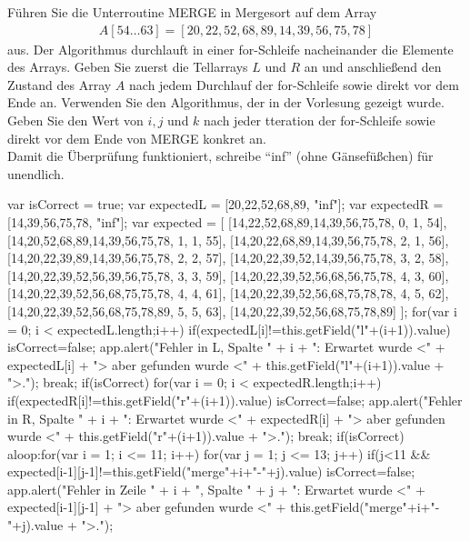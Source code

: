 \documentclass[a4paper,12pt]{article}
\begin{document}
 
\noindent Führen Sie die Unterroutine MERGE in Mergesort auf dem Array
\begin{align*}
    A[54 \ldots 63]=[20,22,52,68,89,14,39,56,75,78]
\end{align*}
aus. Der Algorithmus durchlauft in einer for-Schleife nacheinander die Elemente des Arrays. Geben Sie zuerst die
Tellarrays $L$ und $R$ an und anschlie\ss{}end den Zustand des Array $A$ nach jedem Durchlauf der for-Schleife sowie direkt
vor dem Ende an. Verwenden Sie den Algorithmus, der in der Vorlesung gezeigt wurde. Geben Sie den Wert von $i, j$
und $k$ nach jeder tteration der for-Schleife sowie direkt vor dem Ende von MERGE konkret an.\\
Damit die Überprüfung funktioniert, schreibe "`inf"' (ohne Gänsefü\ss{}chen) für unendlich.
\def\textfieldwidth{.8cm}
\begin{defineJS}{\aNiceScript}
    var isCorrect = true;
    var expectedL = [20,22,52,68,89, "inf"];
    var expectedR = [14,39,56,75,78, "inf"];
    var expected = [
        [14,22,52,68,89,14,39,56,75,78, 0, 1, 54],
        [14,20,52,68,89,14,39,56,75,78, 1, 1, 55],
        [14,20,22,68,89,14,39,56,75,78, 2, 1, 56],
        [14,20,22,39,89,14,39,56,75,78, 2, 2, 57],
        [14,20,22,39,52,14,39,56,75,78, 3, 2, 58],
        [14,20,22,39,52,56,39,56,75,78, 3, 3, 59],
        [14,20,22,39,52,56,68,56,75,78, 4, 3, 60],
        [14,20,22,39,52,56,68,75,75,78, 4, 4, 61],
        [14,20,22,39,52,56,68,75,78,78, 4, 5, 62],
        [14,20,22,39,52,56,68,75,78,89, 5, 5, 63],
        [14,20,22,39,52,56,68,75,78,89]
        ];
    for(var i = 0; i < expectedL.length;i++){
        if(expectedL[i]!=this.getField("l"+(i+1)).value) {
            isCorrect=false;
            app.alert("Fehler in L, Spalte " + i + ": Erwartet wurde <" + expectedL[i] + "> aber gefunden wurde <" + this.getField("l"+(i+1)).value + ">.");
            break;
        }
    }
    if(isCorrect){
        for(var i = 0; i < expectedR.length;i++){
            if(expectedR[i]!=this.getField("r"+(i+1)).value) {
                isCorrect=false;
                app.alert("Fehler in R, Spalte " + i + ": Erwartet wurde <" + expectedR[i] + "> aber gefunden wurde <" + this.getField("r"+(i+1)).value + ">.");
                break;
            }
        }
    }
    if(isCorrect){
        aloop:for(var i = 1; i <= 11; i++) {
            for(var j = 1; j <= 13; j++) {
                if(j<11 && expected[i-1][j-1]!=this.getField("merge"+i+"-"+j).value){
                    isCorrect=false;
                    app.alert("Fehler in Zeile " + i + ", Spalte " + j + ": Erwartet wurde <" + expected[i-1][j-1] + "> aber gefunden wurde <" + this.getField("merge"+i+"-"+j).value  +  ">.");
}}}}
\end{defineJS}
\end{document}
